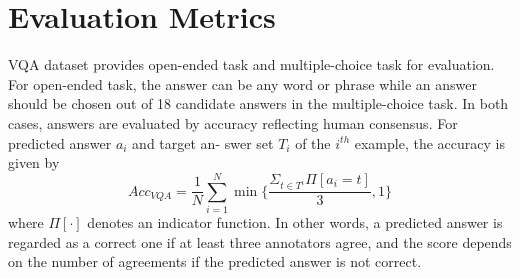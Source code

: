 \documentclass[10pt,twocolumn,letterpaper]{article}
\begin{document}
  \begin{table}[h]
       \caption{\large{performances of different methods on Shanghaitech dataset}} \label{Table1}
  \end{table}
\section{Evaluation Metrics}
VQA dataset provides open-ended task and multiple-choice task for evaluation. For open-ended task, the answer can be any word or phrase while an answer should be chosen out of 18 candidate answers in the multiple-choice task.
In both cases, answers are evaluated by accuracy reflecting
human consensus. For predicted answer $a_i$ and target an-
swer set $T_i$ of the $i^{th}$ example, the accuracy is given by
\begin{equation}
Acc_{VQA}=\frac{1}{N}\sum_{i=1}^{N}\min\{\frac{\Sigma_{t\in{T^i}}\Pi[a_i=t]}{3},1\}
\end{equation}
where $\Pi[\cdot]$ denotes an indicator function. In other words, a
predicted answer is regarded as a correct one if at least three
annotators agree, and the score depends on the number of
agreements if the predicted answer is not correct.
\end{document}

